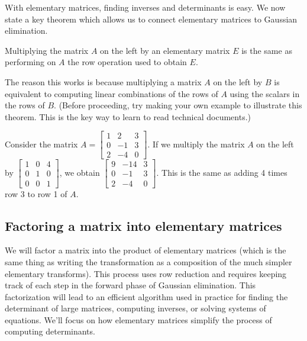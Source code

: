 With elementary matrices, finding inverses and determinants is easy.  We now state a key theorem which allows us to connect elementary matrices to Gaussian elimination.  

\begin{theorem}
Multiplying the matrix $A$ on the left by an elementary matrix $E$ is the same as performing on $A$ the row operation used to obtain $E$.
\end{theorem}
The reason this works is because multiplying a matrix $A$ on the left by $B$ is equivalent to computing linear combinations of the rows of $A$ using the scalars in the rows of $B$. 
(Before proceeding, try making your own example to illustrate this theorem. 
This is the key way to learn to read technical documents.)  

\begin{example}
Consider the matrix 
$A=\begin{bmatrix}
1&2&3\\
0&-1&3\\
2&-4&0
\end{bmatrix}$. 
If we multiply the matrix $A$ on the left by 
$\begin{bmatrix}
1&0&4\\
0&1&0\\
0&0&1
\end{bmatrix}$, 
we obtain 
$\begin{bmatrix}
9&-14&3\\
0&-1&3\\
2&-4&0\end{bmatrix}$. 
This is the same as adding 4 times row 3 to row 1 of $A$.  
\end{example}

\subsection{Factoring a matrix into elementary matrices}

We will factor a matrix into the product of elementary matrices (which is the same thing as writing the transformation as a composition of the much simpler elementary transforms).  This process uses row reduction and requires keeping track of each step in the forward phase of Gaussian elimination.  This factorization will lead to an efficient algorithm used in practice for finding the determinant of large matrices, computing inverses, or solving systems of equations.  We'll focus on how elementary matrices simplify the process of computing determinants.



